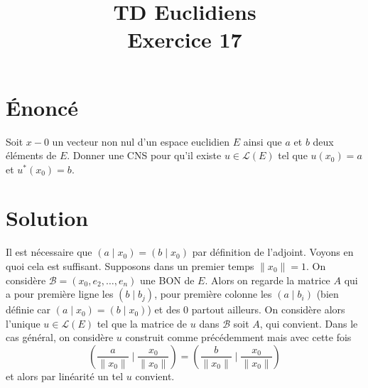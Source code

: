 \documentclass[french]{article}
\title{TD Euclidiens\\ Exercice 17}
\date{}
\newcommand{\st}{^*}
\begin{document}
\maketitle

\section{Énoncé}
Soit $x-0$ un vecteur non nul d'un espace euclidien $E$ ainsi que $a$ et $b$ deux éléments de $E$. Donner une CNS pour qu'il existe $u\in\mathcal{L}(E)$ tel que $u(x_0)=a$ et $u\st(x_0)=b$.
\section{Solution}
Il est nécessaire que $(a\mid x_0)=(b\mid x_0)$ par définition de l'adjoint. Voyons en quoi cela est suffisant. Supposons dans un premier temps $\lVert x_0\rVert=1$. On considère $\mathcal{B}=(x_0,e_2,\ldots,e_n)$ une BON de $E$. Alors on regarde la matrice $A$ qui a pour première ligne les $(b\mid b_j)$, pour première colonne les $(a\mid b_i)$ (bien définie car $(a\mid x_0)=(b\mid x_0)$) et des $0$ partout ailleurs. On considère alors l'unique $u\in\mathcal{L}(E)$ tel que la matrice de $u$ dans $\mathcal{B}$ soit $A$, qui convient. Dans le cas général, on considère $u$ construit comme précédemment mais avec cette fois $$\left(\frac{a}{\lVert x_0\rVert}\mid\frac{x_0}{\lVert x_0\rVert}\right)=\left(\frac{b}{\lVert x_0\rVert}\mid\frac{x_0}{\lVert x_0\rVert}\right)$$ et alors par linéarité un tel $u$ convient.
\end{document}
